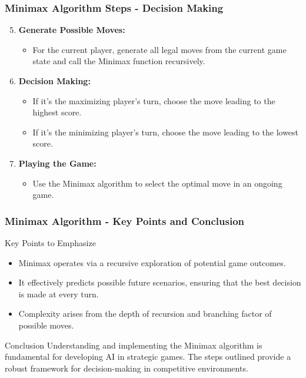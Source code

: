 \documentclass[aspectratio=169]{beamer}
\begin{document}
\begin{frame}[fragile]
    \frametitle{Minimax Algorithm Steps - Decision Making}
    \begin{enumerate}
        \setcounter{enumi}{4}
        \item \textbf{Generate Possible Moves:}
        \begin{itemize}
            \item For the current player, generate all legal moves from the current game state and call the Minimax function recursively.
        \end{itemize}

        \item \textbf{Decision Making:}
        \begin{itemize}
            \item If it’s the maximizing player's turn, choose the move leading to the highest score.
            \item If it’s the minimizing player's turn, choose the move leading to the lowest score.
        \end{itemize}
        
        \item \textbf{Playing the Game:}
        \begin{itemize}
            \item Use the Minimax algorithm to select the optimal move in an ongoing game.
        \end{itemize}
    \end{enumerate}
\end{frame}

\begin{frame}[fragile]
    \frametitle{Minimax Algorithm - Key Points and Conclusion}
    \begin{block}{Key Points to Emphasize}
        \begin{itemize}
            \item Minimax operates via a recursive exploration of potential game outcomes.
            \item It effectively predicts possible future scenarios, ensuring that the best decision is made at every turn.
            \item Complexity arises from the depth of recursion and branching factor of possible moves.
        \end{itemize}
    \end{block}
    
    \begin{block}{Conclusion}
        Understanding and implementing the Minimax algorithm is fundamental for developing AI in strategic games. The steps outlined provide a robust framework for decision-making in competitive environments.
    \end{block}
\end{frame}
\end{document}
